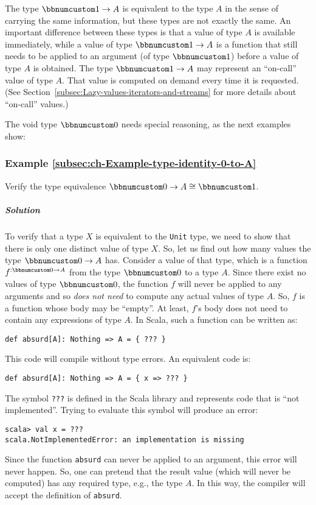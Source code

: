 The type $\bbnum 1\rightarrow A$ is equivalent to the type $A$ in
the sense of carrying the same information, but these types are not
exactly the same. An important difference between these types is that
a value of type $A$ is available immediately, while a value of type
$\bbnum 1\rightarrow A$ is a function that still needs to be applied
to an argument (of type $\bbnum 1$) before a value of type $A$ is
obtained. The type $\bbnum 1\rightarrow A$ may represent an \textsf{``}on-call\textsf{''}
value of type $A$. That value is computed on demand every time it
is requested. (See Section~\ref{subsec:Lazy-values-iterators-and-streams}
for more details about \textsf{``}on-call\textsf{''} values.)

The void type $\bbnum 0$ needs special reasoning,
as the next examples show:

\subsubsection{Example \label{subsec:ch-Example-type-identity-0-to-A}\ref{subsec:ch-Example-type-identity-0-to-A}}

Verify the type equivalence $\bbnum 0\rightarrow A\cong\bbnum 1$.

\subparagraph{Solution}

To verify that a type $X$ is equivalent to the \lstinline!Unit!
type, we need to show that there is only one distinct value of type
$X$. So, let us find out how many values the type $\bbnum 0\rightarrow A$
has. Consider a value of that type, which is a function $f^{:\bbnum 0\rightarrow A}$
from the type $\bbnum 0$ to a type $A$. Since there exist no values
of type $\bbnum 0$, the function $f$ will never be applied to any
arguments and so \emph{does not need} to compute any actual values
of type $A$. So, $f$ is a function whose body may be \textsf{``}empty\textsf{''}.
At least, $f$\textsf{'}s body does not need to contain any expressions of
type $A$. In Scala, such a function can be written as:
\begin{lstlisting}
def absurd[A]: Nothing => A = { ??? }
\end{lstlisting}
This code will compile without type errors. An equivalent code is:
\begin{lstlisting}
def absurd[A]: Nothing => A = { x => ??? }
\end{lstlisting}
The symbol \lstinline!???! is defined in the Scala library and represents
code that is \textsf{``}not implemented\textsf{''}. Trying to evaluate this symbol
will produce an error:
\begin{lstlisting}
scala> val x = ???
scala.NotImplementedError: an implementation is missing
\end{lstlisting}
Since the function \lstinline!absurd! can never be applied to an
argument, this error will never happen. So, one can pretend that the
result value (which will never be computed) has any required type,
e.g., the type $A$. In this way, the compiler will accept the definition
of \lstinline!absurd!.

